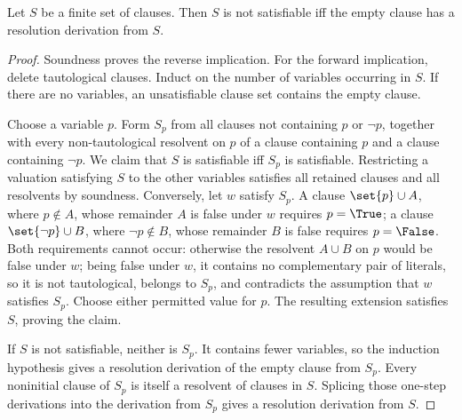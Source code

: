 \begin{theorem}
\label{thm:prop-resolution-complete}
Let \(S\) be a finite set of clauses.  Then \(S\) is not satisfiable
iff the empty clause has a resolution derivation from \(S\).
\end{theorem}
\begin{proof}
Soundness proves the reverse implication.  For the forward implication,
delete tautological clauses.  Induct on the number of variables occurring in
\(S\).  If there are no variables, an unsatisfiable clause set contains the
empty clause.

Choose a variable \(p\).  Form \(S_p\) from all clauses not containing
\(p\) or \(\neg p\), together with every non-tautological resolvent on
\(p\) of a clause containing \(p\) and a clause containing \(\neg p\).  We claim that
\(S\) is satisfiable iff \(S_p\) is satisfiable.  Restricting a valuation
satisfying \(S\) to the other variables satisfies all retained clauses and all
resolvents by soundness.  Conversely, let \(w\) satisfy \(S_p\).  A clause
\(\set{p}\cup A\), where \(p\notin A\), whose remainder \(A\) is false
under \(w\) requires \(p=\True\); a clause
\(\set{\neg p}\cup B\), where \(\neg p\notin B\), whose remainder \(B\)
is false requires \(p=\False\).  Both requirements cannot occur:
otherwise the resolvent \(A\cup B\) on \(p\) would be false under
\(w\); being false under \(w\), it contains no complementary pair of
literals, so it is not tautological, belongs to \(S_p\), and contradicts
the assumption that \(w\) satisfies \(S_p\).  Choose either
permitted value for \(p\).  The resulting extension satisfies \(S\), proving
the claim.

If \(S\) is not satisfiable, neither is \(S_p\).  It contains fewer variables,
so the induction hypothesis gives a resolution derivation of the empty clause
from \(S_p\).  Every noninitial clause of \(S_p\) is itself a resolvent of
clauses in \(S\).  Splicing those one-step derivations into the derivation from
\(S_p\) gives a resolution derivation from \(S\).
\end{proof}

